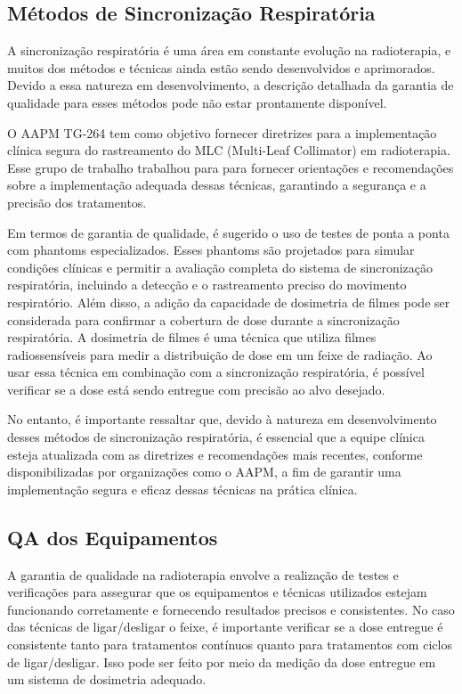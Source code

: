 \documentclass[11pt,a4paper]{article}
\begin{document}
\subsection*{Métodos de Sincronização Respiratória}

	A sincronização respiratória é uma área em constante evolução na radioterapia, e muitos dos métodos e técnicas ainda estão sendo desenvolvidos e aprimorados. Devido a essa natureza em desenvolvimento, a descrição detalhada da garantia de qualidade para esses métodos pode não estar prontamente disponível.

	O AAPM TG-264 tem como objetivo fornecer diretrizes para a implementação clínica segura do rastreamento do MLC (Multi-Leaf Collimator) em radioterapia. Esse grupo de trabalho trabalhou para para fornecer orientações e recomendações sobre a implementação adequada dessas técnicas, garantindo a segurança e a precisão dos tratamentos.

	Em termos de garantia de qualidade, é sugerido o uso de testes de ponta a ponta com phantoms especializados. Esses phantoms são projetados para simular condições clínicas e permitir a avaliação completa do sistema de sincronização respiratória, incluindo a detecção e o rastreamento preciso do movimento respiratório. Além disso, a adição da capacidade de dosimetria de filmes pode ser considerada para confirmar a cobertura de dose durante a sincronização respiratória. A dosimetria de filmes é uma técnica que utiliza filmes radiossensíveis para medir a distribuição de dose em um feixe de radiação. Ao usar essa técnica em combinação com a sincronização respiratória, é possível verificar se a dose está sendo entregue com precisão ao alvo desejado.  

	No entanto, é importante ressaltar que, devido à natureza em desenvolvimento desses métodos de sincronização respiratória, é essencial que a equipe clínica esteja atualizada com as diretrizes e recomendações mais recentes, conforme disponibilizadas por organizações como o AAPM, a fim de garantir uma implementação segura e eficaz dessas técnicas na prática clínica.

\subsection*{QA dos Equipamentos}

	A garantia de qualidade na radioterapia envolve a realização de testes e verificações para assegurar que os equipamentos e técnicas utilizados estejam funcionando corretamente e fornecendo resultados precisos e consistentes. No caso das técnicas de ligar/desligar o feixe, é importante verificar se a dose entregue é consistente tanto para tratamentos contínuos quanto para tratamentos com ciclos de ligar/desligar. Isso pode ser feito por meio da medição da dose entregue em um sistema de dosimetria adequado.
\end{document}

